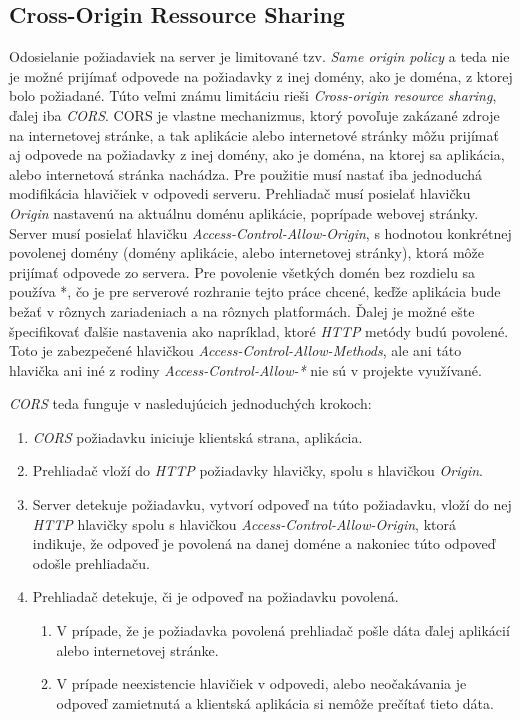 \subsection{Cross-Origin Ressource Sharing}
Odosielanie požiadaviek na server je limitované tzv. \textit{Same origin policy} a teda nie je možné prijímať odpovede na požiadavky z inej domény, ako je doména, z ktorej bolo požiadané. Túto veľmi známu limitáciu rieši \textit{Cross-origin resource sharing}, ďalej iba \textit{CORS}. CORS je vlastne mechanizmus, ktorý povoľuje zakázané zdroje na internetovej stránke, a tak aplikácie alebo internetové stránky môžu prijímať aj odpovede na požiadavky z inej domény, ako je doména, na ktorej sa aplikácia, alebo internetová stránka nachádza. Pre použitie musí nastať iba jednoduchá modifikácia hlavičiek v odpovedi serveru. Prehliadač musí posielať hlavičku \textit{Origin} nastavenú na aktuálnu doménu aplikácie, poprípade webovej stránky. Server musí posielať hlavičku \textit{Access-Control-Allow-Origin}, s hodnotou konkrétnej povolenej domény (domény aplikácie, alebo internetovej stránky), ktorá môže prijímať odpovede zo servera. Pre povolenie všetkých domén bez rozdielu sa používa *, čo je pre serverové rozhranie tejto práce chcené, keďže aplikácia bude bežať v rôznych zariadeniach a na rôznych platformách. Ďalej je možné ešte špecifikovať ďalšie nastavenia ako napríklad, ktoré \textit{HTTP} metódy budú povolené. Toto je zabezpečené hlavičkou \textit{Access-Control-Allow-Methods}, ale ani táto hlavička ani iné z rodiny \textit{Access-Control-Allow-*} nie sú v projekte využívané. 

\textit{CORS} teda funguje v nasledujúcich jednoduchých krokoch:
\begin{enumerate}
\item \textit{CORS} požiadavku iniciuje klientská strana, aplikácia.
\item Prehliadač vloží do \textit{HTTP} požiadavky hlavičky, spolu s hlavičkou \textit{Origin}.
\item Server detekuje požiadavku, vytvorí odpoveď na túto požiadavku, vloží do nej \textit{HTTP} hlavičky spolu s hlavičkou \textit{Access-Control-Allow-Origin}, ktorá indikuje, že odpoveď je povolená na danej doméne a nakoniec túto odpoveď odošle prehliadaču.
\item Prehliadač detekuje, či je odpoveď na požiadavku povolená.
    \begin{enumerate}
    \item V prípade, že je požiadavka povolená prehliadač pošle dáta ďalej aplikácií alebo internetovej stránke.
    \item V prípade neexistencie hlavičiek v odpovedi, alebo neočakávania je odpoveď zamietnutá a klientská aplikácia si nemôže prečítať tieto dáta.
    \end{enumerate}
\end{enumerate}

